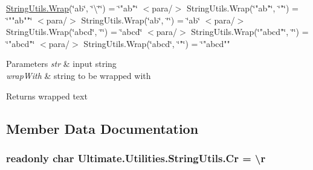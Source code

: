\hyperlink{class_ultimate_1_1_utilities_1_1_string_utils_a168db7c98b834b2da6eb107745d6d944}{String\+Utils.\+Wrap}(\char`\"{}ab\char`\"{}, \char`\"{}\textbackslash{}\char`\"{}\char`\"{})      = \char`\"{}"ab"\char`\"{}
$<$para/$>$ String\+Utils.\+Wrap(\char`\"{}"ab"\char`\"{}, \char`\"{}"\char`\"{})  = \char`\"{}""ab""\char`\"{}
$<$para/$>$ String\+Utils.\+Wrap(\char`\"{}ab\char`\"{}, \char`\"{}\textquotesingle{}\char`\"{})       = \char`\"{}\textquotesingle{}ab\textquotesingle{}\char`\"{}
$<$para/$>$ String\+Utils.\+Wrap(\char`\"{}\textquotesingle{}abcd\textquotesingle{}\char`\"{}, \char`\"{}\textquotesingle{}\char`\"{})   = \char`\"{}\textquotesingle{}\textquotesingle{}abcd\textquotesingle{}\textquotesingle{}\char`\"{}
$<$para/$>$ String\+Utils.\+Wrap(\char`\"{}"abcd"\char`\"{}, \char`\"{}\textquotesingle{}\char`\"{}) = \char`\"{}\textquotesingle{}"abcd"\textquotesingle{}\char`\"{}
$<$para/$>$ String\+Utils.\+Wrap(\char`\"{}\textquotesingle{}abcd\textquotesingle{}\char`\"{}, \char`\"{}"\char`\"{})  = \char`\"{}"\textquotesingle{}abcd\textquotesingle{}"" 


\begin{DoxyParams}{Parameters}
{\em str} & input string\\
\hline
{\em wrap\+With} & string to be wrapped with\\
\hline
\end{DoxyParams}
\begin{DoxyReturn}{Returns}
wrapped text
\end{DoxyReturn}


\subsection{Member Data Documentation}
\subsubsection[{\texorpdfstring{Cr}{Cr}}]{\setlength{\rightskip}{0pt plus 5cm}readonly char Ultimate.\+Utilities.\+String\+Utils.\+Cr = \textquotesingle{}\textbackslash{}r\textquotesingle{}\hspace{0.3cm}{\ttfamily [static]}}\hypertarget{class_ultimate_1_1_utilities_1_1_string_utils_a78aa786db97cecae97f94db472dc1c38}{}\label{class_ultimate_1_1_utilities_1_1_string_utils_a78aa786db97cecae97f94db472dc1c38}



